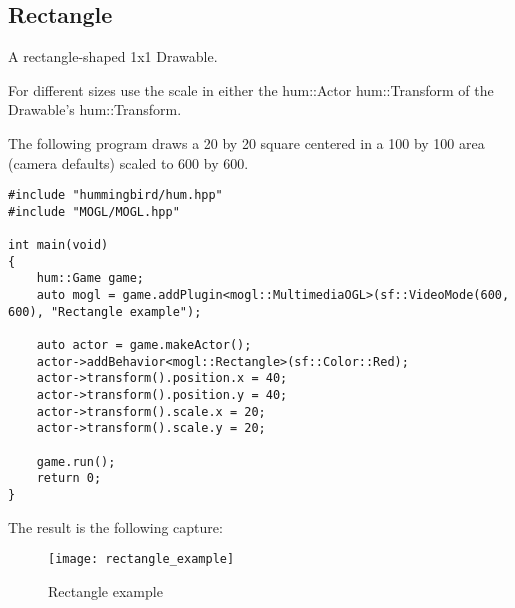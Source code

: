 \subsection{Rectangle}

A rectangle-shaped 1x1 Drawable.

For different sizes use the scale in either the hum::Actor hum::Transform of
the Drawable's hum::Transform.

The following program draws a 20 by 20 square centered in a 100 by 100 area (camera 
defaults) scaled to 600 by 600.
\begin{lstlisting}[caption=Rectangle example]
#include "hummingbird/hum.hpp"
#include "MOGL/MOGL.hpp"

int main(void)
{
    hum::Game game;
    auto mogl = game.addPlugin<mogl::MultimediaOGL>(sf::VideoMode(600, 600), "Rectangle example");

    auto actor = game.makeActor();
    actor->addBehavior<mogl::Rectangle>(sf::Color::Red);
    actor->transform().position.x = 40;
    actor->transform().position.y = 40;
    actor->transform().scale.x = 20;
    actor->transform().scale.y = 20;

    game.run();
    return 0;
}
\end{lstlisting}

The result is the following capture:

\begin{figure}[H]
    \centering
    \texttt{[image: rectangle\_example]}
    \caption{Rectangle example}
    \label{fig:rectangle_example}
\end{figure}
